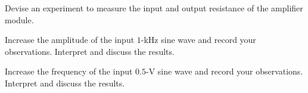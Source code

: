 \documentclass[11pt]{article}
\begin{document}
\begin{question}
\begin{subquestion}{Devise an experiment to measure the input and output resistance of the amplifier module.} 
\answer{}
\end{subquestion}

\begin{subquestion}{Increase the amplitude of the input $1$-kHz sine wave and record your observations. Interpret and discuss the results.} 
\answer{}
\end{subquestion}

\begin{subquestion}{Increase the frequency of the input $0.5$-V sine wave and record your observations. Interpret and discuss the results.} 
\answer{}
\end{subquestion}

\end{question}


\end{document}
